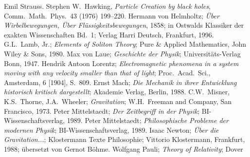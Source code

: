 \begin{thebibliography}{99}
        Emil Strauss.   
   Stephen W.\ Hawking, \textit{Particle Creation by
            black holes}, Comm.\ Math.\ Phys.\ 43 (1976) 199--220.      
 Hermann von Helmholtz; {\em \"Uber Wirbelbewegungen,
        \"Uber Fl\"ussigkeitsbewegungen}, 1858; in Ostwalds Klassiker der 
       exakten Wissenschaften Bd.\ 1; Verlag Harri Deutsch, Frankfurt, 
       1996.                   
 G.L.\ Lamb, Jr.; {\it Elements of Soliton Theory}; 
         Pure \& Applied Mathematics, John Wiley \& Sons, 1980. 
 Max von Laue; {\it Geschichte der Physik}; 
         Universit\"ats-Verlag Bonn, 1947.
 Hendrik Antoon Lorentz; {\it Electromagnetic phenomena 
         in a system moving with any velocity smaller than that of light}; 
         Proc.\ Acad.\ Sci., Amsterdam, 6 [1904], S.\ 809.
 Ernst Mach; {\it Die Mechanik in ihrer Entwicklung
      historisch kritisch dargestellt}; Akademie Verlag, Berlin, 1988.       
 C.W.\ Misner, K.S.\ Thorne, J.A.\ Wheeler; 
        {\it Gravitation}; W.H.\ Freeman and Company, San Francisco,
        1973.
 Peter Mittelstaedt; {\it Der Zeitbegriff in der
        Physik}; BI-Wissenschaftsverlag, 1989.        
 Peter Mittelstaedt; {\it Philosophische Probleme
        der modernen Physik}; BI-Wissenschaftsverlag, 1989.        
 Isaac Newton; {\it \"Uber die Gravitation...};
       Klostermann Texte Philosophie; Vittorio Klostermann, Frankfurt,
      1988; \"ubersetzt von Gernot B\"ohme.
 Wolfgang Pauli; {\it Theory of Relativity}; Dover

\end{thebibliography}
